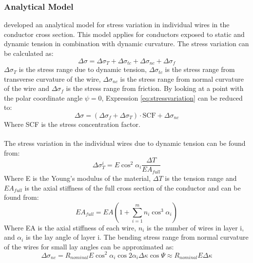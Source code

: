 \subsubsection{Analytical Model} \cite{s300} developed an analytical model for stress variation in individual wires in the conductor cross section. This model applies for conductors exposed to static and dynamic tension in combination with dynamic curvature. The stress variation can be calculated as:   
\begin{equation}
    \Delta \sigma = \Delta \sigma_T + \Delta \sigma_{tc} + \Delta \sigma_{nc} + \Delta \sigma_{f}
    \label{eq:stressvariation}
\end{equation}
\noindentWhere $\Delta \sigma_T$ is the stress range due to dynamic tension, $\Delta \sigma_{tc}$ is the stress range from transverse curvature of the wire, $\Delta \sigma_{nc}$ is the stress range from normal curvature of the wire and $\Delta \sigma_{f}$ is the stress range from friction. By looking at a point with the polar coordinate angle $\psi = 0$, Expression \ref{eq:stressvariation} can be reduced to:
\begin{equation}
    \Delta \sigma = (\Delta \sigma_f + \Delta \sigma_{T})\cdot \text{SCF} + \Delta \sigma_{nc}
    \label{eq:stressvariationred}
\end{equation}Where SCF is the stress concentration factor. \\\\The stress variation in the individual wires due to dynamic tension can be found from:
\begin{equation}
    \Delta \sigma_T^i = E \cos^2 \alpha_i \frac{\Delta T}{E A_{full}} 
    \label{eq:sigmaT}
\end{equation}
\noindent Where E is the Young's modulus of the material, $\Delta T$ is the tension range and $EA_{full}$  is the axial stiffness of the full cross section of the conductor and can be found from:
\begin{equation}
    EA_{full}=EA \left( 1+\sum_{i=1}^m n_i \cos^3\alpha_i \right)
\end{equation}
\noindent Where EA is the axial stiffness of each wire, $n_i$ is the number of wires in layer i, and $\alpha_i$ is the lay angle of layer i. \newline
\newline
The bending stress range from normal curvature of the wires for small lay angles can be approximated as:
\begin{equation}
    \Delta \sigma_{nc} = R_{nominal} E \cos^2 \alpha_i \cos2 \alpha_i \Delta \kappa \cos \Psi \approx R_{nominal}E \Delta \kappa
\end{equation}
